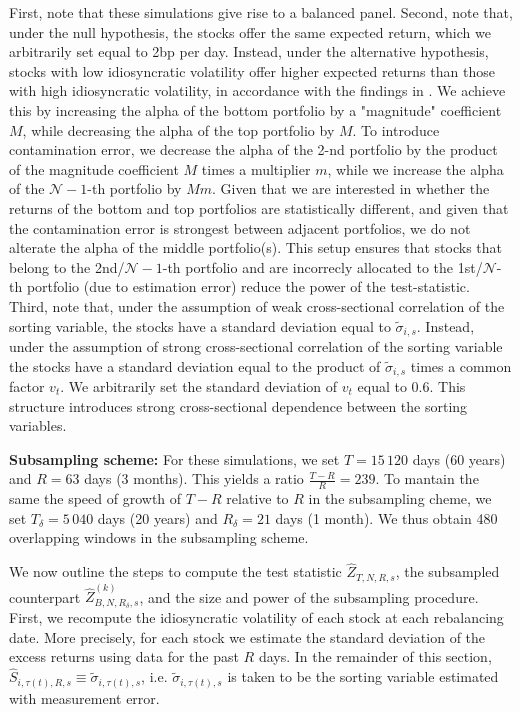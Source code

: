 First, note that these simulations give rise to a balanced panel. Second, note that, under the null hypothesis, the stocks offer the same expected return, which we arbitrarily set equal to 2bp per day. Instead, under the alternative hypothesis, stocks with low idiosyncratic volatility offer higher expected returns than those with high idiosyncratic volatility, in accordance with the findings in \cite{ang2006cross}. We achieve this by increasing the alpha of the bottom portfolio by a "magnitude" coefficient $M$, while decreasing the alpha of the top portfolio by $M$. To introduce contamination error, we decrease the alpha of the 2-nd portfolio by the product of the magnitude coefficient $M$ times a multiplier $m$, while we increase the alpha of the $\mathcal{N}-1$-th portfolio by $M m$. Given that we are interested in whether the returns of the bottom and top portfolios are statistically different, and given that the contamination error is strongest between adjacent portfolios, we do not alterate the alpha of the middle portfolio(s). This setup ensures that stocks that belong to the 2nd/$\mathcal{N}-1$-th portfolio and are incorrecly allocated to the 1st/$\mathcal{N}$-th portfolio (due to estimation error) reduce the power of the test-statistic. Third, note that, under the assumption of weak cross-sectional correlation of the sorting variable, the stocks have a standard deviation equal to $\widetilde{\sigma}_{i,s}$. Instead, under the assumption of strong cross-sectional correlation of the sorting variable the stocks have a standard deviation equal to the product of $\widetilde{\sigma}_{i,s}$ times a common factor $v_t$. We arbitrarily set the standard deviation of $v_t$ equal to 0.6. This structure introduces strong cross-sectional dependence between the sorting variables. 

\textbf{Subsampling scheme:} For these simulations, we set $T=15\,120$ days (60 years) and $R=63$ days (3 months). This yields a ratio $\frac{T-R}{R} = 239$. To mantain the same the speed of growth of $T-R$ relative to $R$ in the subsampling cheme, we set $T_\delta = 5\,040$ days (20 years) and $R_\delta = 21$ days (1 month). We thus obtain 480 overlapping windows in the subsampling scheme. 

We now outline the steps to compute the test statistic $\widehat{Z}_{T,N,R,s}$, the subsampled counterpart $\widehat{Z}_{B,N,R_\delta,s}^{(k)}$, and the size and power of the subsampling procedure. First, we recompute the idiosyncratic volatility of each stock at each rebalancing date. More precisely, for each stock we estimate %
the standard deviation of the excess returns using data for the past $R$ days. %
In the remainder of this section, $\widehat{S}_{i,\tau(t),R,s} \equiv \widetilde{\sigma}_{i,\tau(t),s}$, i.e. $\widetilde{\sigma}_{i,\tau(t),s}$ is taken to be the sorting variable estimated with measurement error.  


